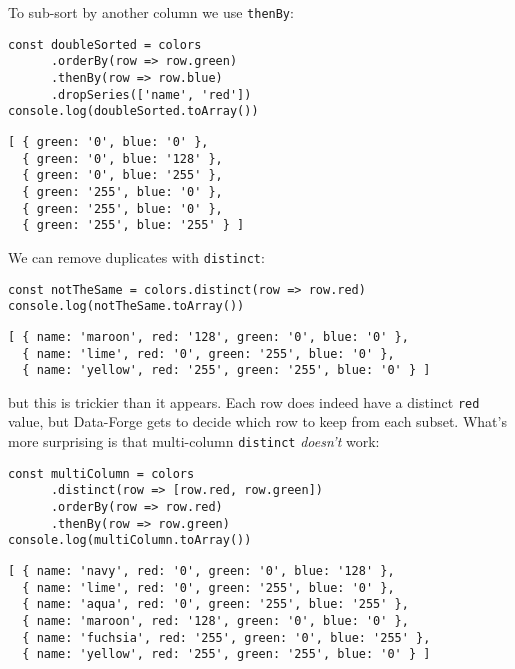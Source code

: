 \noindent
To sub-sort by another column we use \texttt{thenBy}:

\begin{verbatim}
const doubleSorted = colors
      .orderBy(row => row.green)
      .thenBy(row => row.blue)
      .dropSeries(['name', 'red'])
console.log(doubleSorted.toArray())
\end{verbatim}

\begin{verbatim}
[ { green: '0', blue: '0' },
  { green: '0', blue: '128' },
  { green: '0', blue: '255' },
  { green: '255', blue: '0' },
  { green: '255', blue: '0' },
  { green: '255', blue: '255' } ]
\end{verbatim}


We can remove duplicates with \texttt{distinct}:

\begin{verbatim}
const notTheSame = colors.distinct(row => row.red)
console.log(notTheSame.toArray())
\end{verbatim}

\begin{verbatim}
[ { name: 'maroon', red: '128', green: '0', blue: '0' },
  { name: 'lime', red: '0', green: '255', blue: '0' },
  { name: 'yellow', red: '255', green: '255', blue: '0' } ]
\end{verbatim}

\noindent
but this is trickier than it appears.
Each row does indeed have a distinct \texttt{red} value,
but Data-Forge gets to decide which row to keep from each subset.
What's more surprising is that multi-column \texttt{distinct} \emph{doesn't} work:

\begin{verbatim}
const multiColumn = colors
      .distinct(row => [row.red, row.green])
      .orderBy(row => row.red)
      .thenBy(row => row.green)
console.log(multiColumn.toArray())
\end{verbatim}

\begin{verbatim}
[ { name: 'navy', red: '0', green: '0', blue: '128' },
  { name: 'lime', red: '0', green: '255', blue: '0' },
  { name: 'aqua', red: '0', green: '255', blue: '255' },
  { name: 'maroon', red: '128', green: '0', blue: '0' },
  { name: 'fuchsia', red: '255', green: '0', blue: '255' },
  { name: 'yellow', red: '255', green: '255', blue: '0' } ]
\end{verbatim}

